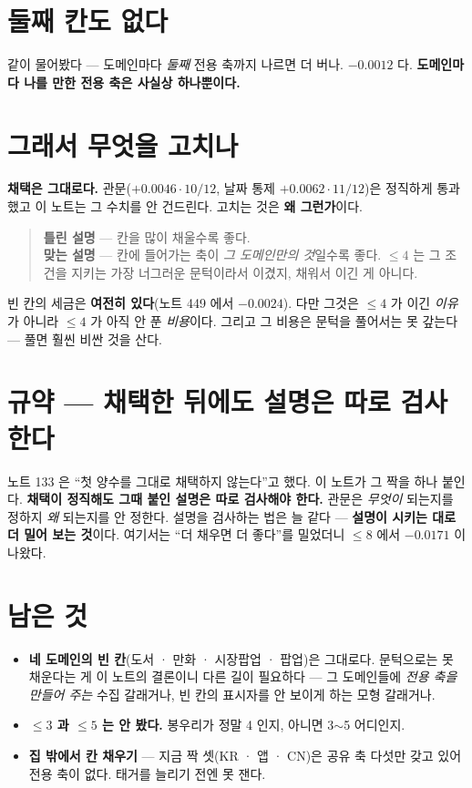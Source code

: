 \documentclass[11pt]{article}
\begin{document}
\section{둘째 칸도 없다}

같이 물어봤다 --- 도메인마다 \emph{둘째} 전용 축까지 나르면 더 버나.
$-0.0012$ 다. \textbf{도메인마다 나를 만한 전용 축은 사실상 하나뿐이다.}

\section{그래서 무엇을 고치나}

\textbf{채택은 그대로다.} 관문($+0.0046 \cdot 10/12$, 날짜 통제
$+0.0062 \cdot 11/12$)은 정직하게 통과했고 이 노트는 그 수치를 안
건드린다. 고치는 것은 \textbf{왜 그런가}이다.

\begin{quote}
\textbf{틀린 설명} --- 칸을 많이 채울수록 좋다. \\
\textbf{맞는 설명} --- 칸에 들어가는 축이 \emph{그 도메인만의 것}일수록
좋다. $\le 4$ 는 그 조건을 지키는 가장 너그러운 문턱이라서 이겼지,
채워서 이긴 게 아니다.
\end{quote}

빈 칸의 세금은 \textbf{여전히 있다}(노트 449 에서 $-0.0024$). 다만 그것은
$\le 4$ 가 이긴 \emph{이유}가 아니라 $\le 4$ 가 아직 안 푼 \emph{비용}이다.
그리고 그 비용은 문턱을 풀어서는 못 갚는다 --- 풀면 훨씬 비싼 것을 산다.

\section*{규약 --- 채택한 뒤에도 설명은 따로 검사한다}

노트 133 은 ``첫 양수를 그대로 채택하지 않는다''고 했다. 이 노트가 그
짝을 하나 붙인다. \textbf{채택이 정직해도 그때 붙인 설명은 따로
검사해야 한다.} 관문은 \emph{무엇이} 되는지를 정하지 \emph{왜} 되는지를
안 정한다. 설명을 검사하는 법은 늘 같다 --- \textbf{설명이 시키는 대로
더 밀어 보는 것}이다. 여기서는 ``더 채우면 더 좋다''를 밀었더니 $\le 8$
에서 $-0.0171$ 이 나왔다.

\section*{남은 것}

\begin{itemize}
\item \textbf{네 도메인의 빈 칸}(도서 · 만화 · 시장팝업 · 팝업)은
그대로다. 문턱으로는 못 채운다는 게 이 노트의 결론이니 다른 길이
필요하다 --- 그 도메인들에 \emph{전용 축을 만들어 주는} 수집 갈래거나,
빈 칸의 표시자를 안 보이게 하는 모형 갈래거나.
\item \textbf{$\le 3$ 과 $\le 5$ 는 안 봤다.} 봉우리가 정말 4 인지,
아니면 3$\sim$5 어디인지.
\item \textbf{집 밖에서 칸 채우기} --- 지금 짝 셋(KR · 앱 · CN)은 공유 축
다섯만 갖고 있어 전용 축이 없다. 태거를 늘리기 전엔 못 잰다.
\end{itemize}
\end{document}
